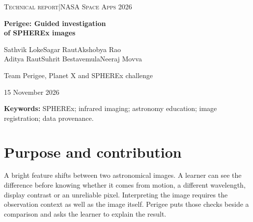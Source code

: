 \documentclass[11pt,letterpaper]{article}
\begin{document}
\thispagestyle{plain}
\begin{center}
 {\small\scshape Technical report\quad |\quad NASA Space Apps 2026}\par
 \vspace{12pt}
 {\LARGE\bfseries Perigee: Guided investigation\\[4pt]of SPHEREx images}\par
 \vspace{13pt}
 {Sathvik Loke\quad Sagar Raut\quad Akshobya Rao}\\[4pt]
 {Aditya Raut\quad Suhrit Bestavemula\quad Neeraj Movva}\par
 \vspace{8pt}
 {\small Team Perigee, Planet X and SPHEREx challenge}\par
 {\small 15 November 2026}
\end{center}
\vspace{6pt}
\begin{abstract}
Perigee is a browser application for comparing NASA SPHEREx infrared observations and recording what those comparisons support. Students can start with a guided investigation, inspect observation dates and wavelengths, check pixel quality, and export an explanation with its source records. We built three investigations around apparent motion in Barnard's Star, time and wavelength comparisons of Epsilon Indi B, and a flagged feature in the WISE 0855 field. The processing pipeline converts archive FITS cutouts into images on a fixed sky grid and retains the metadata needed to reproduce the view. Our retained dataset contains 183 unique cutouts from five fields. An independent field-star registration check returned 128 PASS and 55 UNKNOWN verdicts, with no FAIL verdicts; tests with deliberately displaced pixels rejected all tested shifts of 1, 2 and 5 native pixels on three selected frames. The report describes the implementation, case evidence and checks behind these results. Perigee's contribution is a guided comparison workflow in which a learner's explanation remains connected to the observations and processing choices used to reach it.
\end{abstract}
\vspace{4pt}
\noindent\textbf{Keywords:} SPHEREx; infrared imaging; astronomy education; image registration; data provenance.

\section{Purpose and contribution}
A bright feature shifts between two astronomical images. A learner can see the difference before knowing whether it comes from motion, a different wavelength, display contrast or an unreliable pixel. Interpreting the image requires the observation context as well as the image itself. Perigee puts those checks beside a comparison and asks the learner to explain the result.
\end{document}
